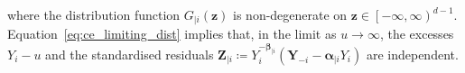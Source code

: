 \documentclass[12pt,compact]{article}
\DeclareMathOperator{\CE}{\mathrm{CE}}
\begin{document}
where the distribution function $G_{\mid i}\left(\symbf{z}\right)$ is non-degenerate on $\symbf{z} \in \left[ -\infty, \infty \right)^{d-1}$.
Equation~\eqref{eq:ce_limiting_dist} implies that, in the limit as $u\to\infty$, the excesses $Y_i-u$ and the standardised residuals 
$\symbf{Z}_{\mid i} \coloneqq Y_i^{-\symbf{\beta}_{\mid i}}\left(\symbf{Y}_{-i} - \symbf{\alpha}_{\mid i} Y_{i}\right)$ are independent.
\end{document}

